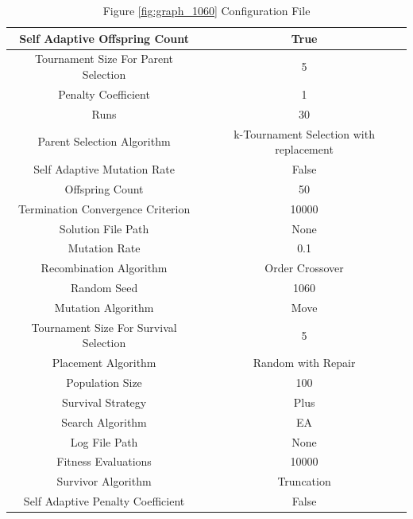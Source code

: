 \documentclass{standalone}
\begin{document}
\begin{table}[!htb]
	\centering
	\caption{Figure \ref{fig:graph_1060} Configuration File}
	\label{tab:graph_1060}
	\begin{tabular}{| c | c |}
		\hline
		Self Adaptive Offspring Count		& True		 \\
		\hline
		Tournament Size For Parent Selection		& 5		 \\
		\hline
		Penalty Coefficient		& 1		 \\
		\hline
		Runs		& 30		 \\
		\hline
		Parent Selection Algorithm		& k-Tournament Selection with replacement		 \\
		\hline
		Self Adaptive Mutation Rate		& False		 \\
		\hline
		Offspring Count		& 50		 \\
		\hline
		Termination Convergence Criterion		& 10000		 \\
		\hline
		Solution File Path		& None		 \\
		\hline
		Mutation Rate		& 0.1		 \\
		\hline
		Recombination Algorithm		& Order Crossover		 \\
		\hline
		Random Seed		& 1060		 \\
		\hline
		Mutation Algorithm		& Move		 \\
		\hline
		Tournament Size For Survival Selection		& 5		 \\
		\hline
		Placement Algorithm		& Random with Repair		 \\
		\hline
		Population Size		& 100		 \\
		\hline
		Survival Strategy		& Plus		 \\
		\hline
		Search Algorithm		& EA		 \\
		\hline
		Log File Path		& None		 \\
		\hline
		Fitness Evaluations		& 10000		 \\
		\hline
		Survivor Algorithm		& Truncation		 \\
		\hline
		Self Adaptive Penalty Coefficient		& False		 \\
		\hline
	\end{tabular}
\end{table}
\end{document}
